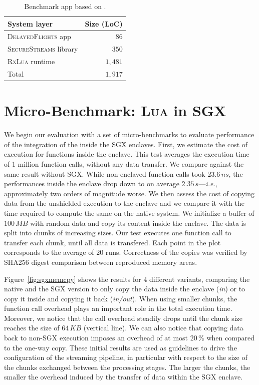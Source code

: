 \begin{table}[t]
    \centering
    \begin{tabular}{l|r}
\textbf{System layer}          & \textbf{Size (LoC)} \\
\hline
\textsc{DelayedFlights} app    & $86$ \\
\textsc{SecureStreams} library & $350$ \\
\textsc{RxLua} runtime         & $1,481$ \\
\hline
\hline
Total                          & $1,917$ \\
    \end{tabular}
    \caption{Benchmark app based on \SS{}.}
  \label{tab:appsize}
\end{table}

\section{Micro-Benchmark: \textsc{Lua} in SGX}

We begin our evaluation with a set of micro-benchmarks to evaluate performance of the integration of the \luavm inside the SGX enclaves.
First, we estimate the cost of execution for functions inside the enclave.
This test averages the execution time of 1 million function calls, without any data transfer.
We compare against the same result without SGX.
While non-enclaved function calls took $23.6\,\mathit{ns}$, the performances inside the enclave drop down to on average $2.35\,\mathit{s}$---\textit{i.e.}, approximately two orders of magnitude worse.
We then assess the cost of copying data from the unshielded execution to the enclave and we compare it with the time required to compute the same on the native system.
We initialize a buffer of $100\,\mathit{MB}$ with random data and copy its content inside the enclave.
The data is split into chunks of increasing sizes.
Our test executes one function call to transfer each chunk, until all data is transfered.
Each point in the plot corresponds to the average of $20$ runs.
Correctness of the copies was verified by \textsf{SHA256} digest comparison between reproduced memory areas.

Figure~\ref{fig:sgxmemcpy} shows the results for $4$ different variants, comparing the native and the SGX version to only copy the data inside the enclave (\emph{in}) or to copy it inside and copying it back (\emph{in/out}).
When using smaller chunks, the function call overhead plays an important role in the total execution time.
Moreover, we notice that the call overhead steadily drops until the chunk size reaches the size of $64\,\mathit{KB}$ (vertical line).
We can also notice that copying data back to non-SGX execution imposes an overhead of at most $20\,\mathit{\%}$ when compared to the one-way copy.
These initial results are used as guidelines to drive the configuration of the streaming pipeline, in particular with respect to the size of the chunks exchanged between the processing stages.
The larger the chunks, the smaller the overhead induced by the transfer of data within the SGX enclave.

